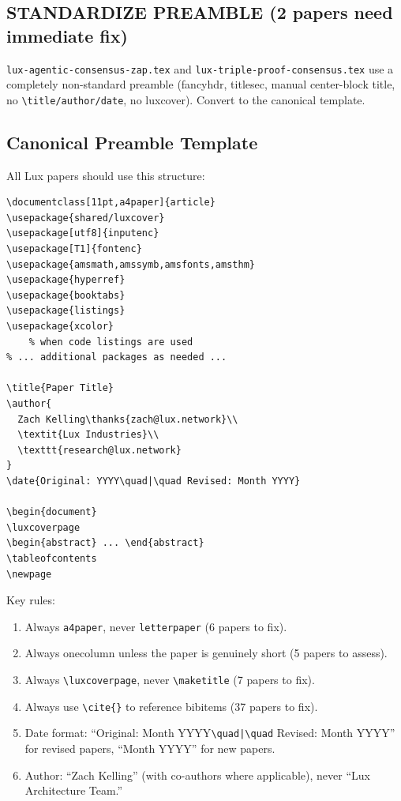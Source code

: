 \documentclass[11pt,a4paper]{article}
\begin{document}
\subsection{STANDARDIZE PREAMBLE (2 papers need immediate fix)}

\texttt{lux-agentic-consensus-zap.tex} and \texttt{lux-triple-proof-consensus.tex}
use a completely non-standard preamble (fancyhdr, titlesec, manual center-block
title, no \texttt{\textbackslash title/author/date}, no luxcover). Convert to
the canonical template.

\subsection{Canonical Preamble Template}

All Lux papers should use this structure:

\begin{verbatim}
\documentclass[11pt,a4paper]{article}
\usepackage{shared/luxcover}
\usepackage[utf8]{inputenc}
\usepackage[T1]{fontenc}
\usepackage{amsmath,amssymb,amsfonts,amsthm}
\usepackage{hyperref}
\usepackage{booktabs}
\usepackage{listings}
\usepackage{xcolor}
    % when code listings are used
% ... additional packages as needed ...

\title{Paper Title}
\author{
  Zach Kelling\thanks{zach@lux.network}\\
  \textit{Lux Industries}\\
  \texttt{research@lux.network}
}
\date{Original: YYYY\quad|\quad Revised: Month YYYY}

\begin{document}
\luxcoverpage
\begin{abstract} ... \end{abstract}
\tableofcontents
\newpage
\end{verbatim}

Key rules:
\begin{enumerate}
\item Always \texttt{a4paper}, never \texttt{letterpaper} (6 papers to fix).
\item Always onecolumn unless the paper is genuinely short (5 papers to assess).
\item Always \texttt{\textbackslash luxcoverpage}, never \texttt{\textbackslash maketitle} (7 papers to fix).
\item Always use \texttt{\textbackslash cite\{\}} to reference bibitems (37 papers to fix).
\item Date format: ``Original: Month YYYY\texttt{\textbackslash quad|\textbackslash quad} Revised: Month YYYY'' for revised papers, ``Month YYYY'' for new papers.
\item Author: ``Zach Kelling'' (with co-authors where applicable), never ``Lux Architecture Team.''
\end{enumerate}
\end{document}
